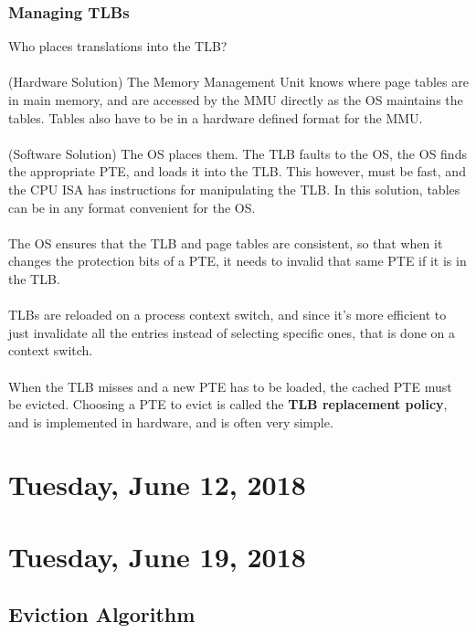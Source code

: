 \documentclass{article}
\begin{document}
\subsubsection{Managing TLBs}

Who places translations into the TLB?\\
\\
(Hardware Solution) The Memory Management Unit knows where page tables are in main memory, and are accessed by the MMU directly as the OS maintains the tables. Tables also have to be in a hardware defined format for the MMU.\\
\\
(Software Solution) The OS places them. The TLB faults to the OS, the OS finds the appropriate PTE, and loads it into the TLB. This however, must be fast, and the CPU ISA has instructions for manipulating the TLB. In this solution, tables can be in any format convenient for the OS.\\
\\
The OS ensures that the TLB and page tables are consistent, so that when it changes the protection bits of a PTE, it needs to invalid that same PTE if it is in the TLB.\\
\\
TLBs are reloaded on a process context switch, and since it's more efficient to just invalidate all the entries instead of selecting specific ones, that is done on a context switch.\\
\\
When the TLB misses and a new PTE has to be loaded, the cached PTE must be evicted. Choosing a PTE to evict is called the \textbf{TLB replacement policy}, and is implemented in hardware, and is often very simple.

\newpage

\section{Tuesday, June 12, 2018}



\newpage

\section{Tuesday, June 19, 2018}

\subsection{Eviction Algorithm}
\end{document}
